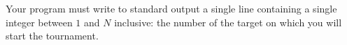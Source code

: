 Your program must write to standard output a single line containing a single integer between $1$ and $N$ inclusive: the number of the target on which you will start the tournament. 
